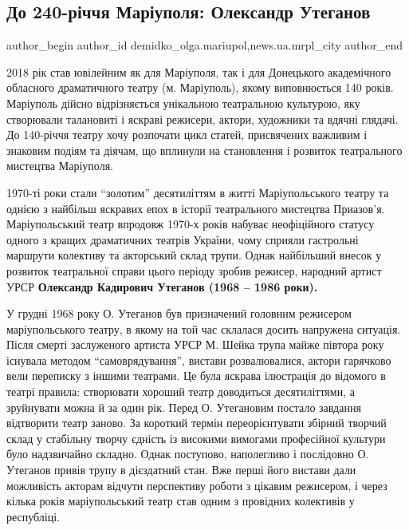  
 
 
 
 
 
\subsection{До 240-річчя Маріуполя: Олександр Утеганов}
\label{sec:27_08_2018.stz.news.ua.mrpl_city.1.240_rokiv_mrpl_oleksandr_uteganov}
 
\ifcmt
 author_begin
   author_id demidko_olga.mariupol,news.ua.mrpl_city
 author_end
\fi

2018 рік став ювілейним як для Маріуполя, так і для Донецького академічного
обласного драматичного театру (м. Маріуполь), якому виповнюється 140 років.
Маріуполь дійсно відрізняється унікальною театральною культурою, яку створювали
талановиті і яскраві режисери, актори, художники та вдячні глядачі. До
140-річчя театру хочу розпочати цикл статей, присвячених важливим і знаковим
подіям та діячам, що вплинули на становлення і розвиток театрального мистецтва
Маріуполя.

1970-ті роки стали \enquote{золотим} десятиліттям в житті Маріупольського театру та
однією з найбільш яскравих епох в історії театрального мистецтва Приазов'я.
Маріупольський театр впродовж 1970-х років набуває неофіційного статусу одного
з кращих драматичних театрів України, чому сприяли гастрольні маршрути
колективу та акторський склад трупи. Однак найбільший внесок у розвиток
театральної справи цього періоду зробив режисер, народний артист УРСР \textbf{Олександр
Кадирович Утеганов (1968 – 1986 роки).}


У грудні 1968 року О. Утеганов був призначений головним режисером
маріупольського театру, в якому на той час склалася досить напружена ситуація.
Після смерті заслуженого артиста УРСР М. Шейка трупа майже півтора року
існувала методом \enquote{самоврядування}, вистави розвалювалися, актори гарячково вели
переписку з іншими театрами. Це була яскрава ілюстрація до відомого в театрі
правила: створювати хороший театр доводиться десятиліттями, а зруйнувати можна
й за один рік. Перед О. Утегановим постало завдання відтворити театр заново. За
короткий термін переорієнтувати збірний творчий склад у стабільну творчу
єдність із високими вимогами професійної культури було надзвичайно складно.
Однак поступово, наполегливо і послідовно О. Утеганов привів трупу в дієздатний
стан. Вже перші його вистави дали можливість акторам відчути перспективу роботи
з цікавим режисером, і через кілька років маріупольський театр став одним з
провідних колективів у республіці.


